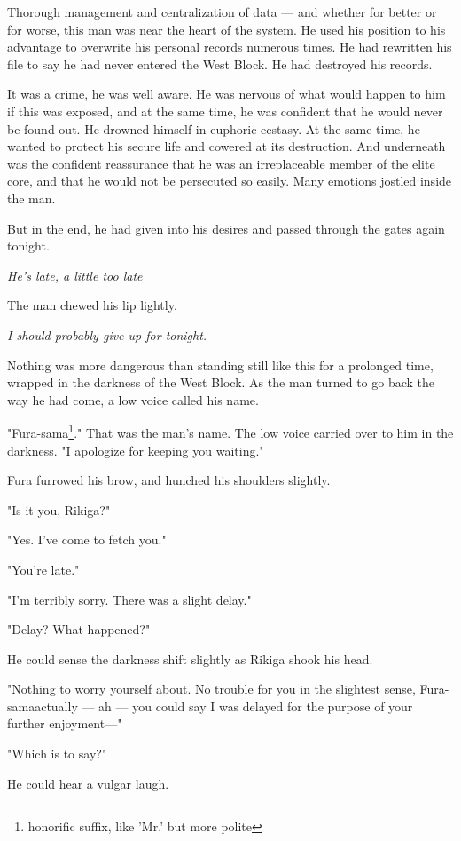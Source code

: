 Thorough management and centralization of data --- and whether for better
or for worse, this man was near the heart of the system. He used his
position to his advantage to overwrite his personal records numerous
times. He had rewritten his file to say he had never entered the West
Block. He had destroyed his records.

It was a crime, he was well aware. He was nervous of what would happen
to him if this was exposed, and at the same time, he was confident that
he would never be found out. He drowned himself in euphoric ecstasy. At
the same time, he wanted to protect his secure life and cowered at its
destruction. And underneath was the confident reassurance that he was an
irreplaceable member of the elite core, and that he would not be
persecuted so easily. Many emotions jostled inside the man.

But in the end, he had given into his desires and passed through the
gates again tonight.

\emph{He's late, a little too late\el }

The man chewed his lip lightly.

\emph{I should probably give up for tonight.}

Nothing was more dangerous than standing still like this for a prolonged
time, wrapped in the darkness of the West Block. As the man turned to go
back the way he had come, a low voice called his name.

"Fura-sama\footnote{honorific suffix, like 'Mr.' but more polite}." That was the man's name. The low voice carried over to him
in the darkness. "I apologize for keeping you waiting."

Fura furrowed his brow, and hunched his shoulders slightly.

"Is it you, Rikiga?"

"Yes. I've come to fetch you."

"You're late."

"I'm terribly sorry. There was a slight delay."

"Delay? What happened?"

He could sense the darkness shift slightly as Rikiga shook his head.

"Nothing to worry yourself about. No trouble for you in the slightest
sense, Fura-sama\el actually --- ah --- you could say I was delayed for the
purpose of your further enjoyment---"

"Which is to say?"

He could hear a vulgar laugh.

